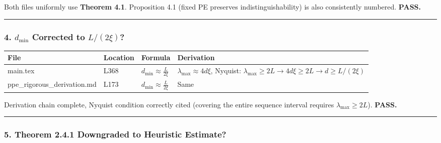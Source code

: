 \documentclass[
  12pt,
]{article}
\begin{document}
Both files uniformly use \textbf{Theorem 4.1}. Proposition 4.1 (fixed PE preserves indistinguishability) is also consistently numbered. \textbf{PASS.}

\begin{center}\rule{0.5\linewidth}{0.5pt}\end{center}

\subsubsection{4. $d_{\min}$ Corrected to $L/(2\xi)$?}\label{dmin-corrected}

\begin{longtable}[]{@{}
  >{\raggedright\arraybackslash}p{}
  >{\raggedright\arraybackslash}p{}
  >{\raggedright\arraybackslash}p{}
  >{\raggedright\arraybackslash}p{}@{}}
\toprule\noalign{}
\begin{minipage}[b]{\linewidth}\raggedright
File
\end{minipage} & \begin{minipage}[b]{\linewidth}\raggedright
Location
\end{minipage} & \begin{minipage}[b]{\linewidth}\raggedright
Formula
\end{minipage} & \begin{minipage}[b]{\linewidth}\raggedright
Derivation
\end{minipage} \\
\midrule\noalign{}
\endhead
\bottomrule\noalign{}
\endlastfoot
main.tex & L368 & $d_{\min} \approx \frac{L}{2\xi}$ & $\lambda_{\max} \approx 4d\xi$, Nyquist: $\lambda_{\max} \geq 2L \to 4d\xi \geq 2L \to d \geq L/(2\xi)$ \\
ppe\_rigorous\_derivation.md & L173 & $d_{\min} \approx \frac{L}{2\xi}$ & Same \\
\end{longtable}

Derivation chain complete, Nyquist condition correctly cited (covering the entire sequence interval requires $\lambda_{\max} \geq 2L$). \textbf{PASS.}

\begin{center}\rule{0.5\linewidth}{0.5pt}\end{center}

\subsubsection{5. Theorem 2.4.1 Downgraded to Heuristic Estimate?}\label{thm-2.4.1-downgraded}
\end{document}
